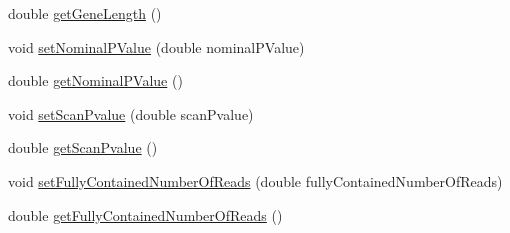 \begin{DoxyCompactItemize}
double \hyperlink{classbroad_1_1pda_1_1seq_1_1segmentation_1_1_gene_score_ad840bce93ebbf0eb74ce7cbba4736dd4}{get\+Gene\+Length} ()
\item 
void \hyperlink{classbroad_1_1pda_1_1seq_1_1segmentation_1_1_gene_score_a16677af1c9b8dd68bb1ef9d2b772f331}{set\+Nominal\+P\+Value} (double nominal\+P\+Value)
\item 
double \hyperlink{classbroad_1_1pda_1_1seq_1_1segmentation_1_1_gene_score_aebdc322e453c50557063a98d27f8a203}{get\+Nominal\+P\+Value} ()
\item 
void \hyperlink{classbroad_1_1pda_1_1seq_1_1segmentation_1_1_gene_score_ada83d50ea66182562a60dec6217f8e71}{set\+Scan\+Pvalue} (double scan\+Pvalue)
\item 
double \hyperlink{classbroad_1_1pda_1_1seq_1_1segmentation_1_1_gene_score_a37af0b606cb0805c4f70a196bd2c3554}{get\+Scan\+Pvalue} ()
\item 
void \hyperlink{classbroad_1_1pda_1_1seq_1_1segmentation_1_1_gene_score_aaab5b034ea344de92acc299889232dce}{set\+Fully\+Contained\+Number\+Of\+Reads} (double fully\+Contained\+Number\+Of\+Reads)
\item 
double \hyperlink{classbroad_1_1pda_1_1seq_1_1segmentation_1_1_gene_score_a9cdb44154d8a541fab9bebbb26f3b566}{get\+Fully\+Contained\+Number\+Of\+Reads} ()
\end{DoxyCompactItemize}


